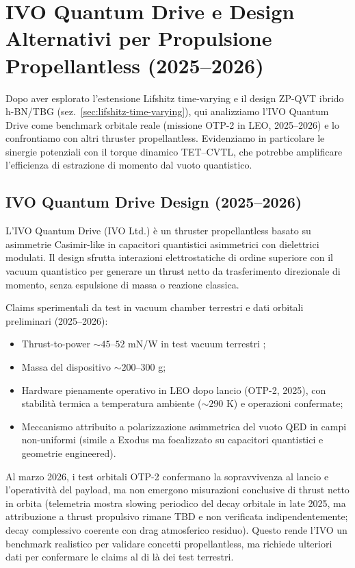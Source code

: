 \documentclass[11pt,a4paper]{article}
\let\oldcite\cite
\renewcommand{\cite}{\protect\oldcite}
\let\oldref\ref
\renewcommand{\ref}{\protect\oldref}
\theoremstyle{plain}
\theoremstyle{definition}
\begin{document}
\vspace{0.4cm}


\section{IVO Quantum Drive e Design Alternativi per Propulsione Propellantless (2025--2026)}
\label{sec:ivo-and-alternatives}

Dopo aver esplorato l'estensione Lifshitz time-varying e il design ZP-QVT ibrido h-BN/TBG (sez.~\ref{sec:lifshitz-time-varying}), qui analizziamo l'IVO Quantum Drive come benchmark orbitale reale (missione OTP-2 in LEO, 2025--2026) e lo confrontiamo con altri thruster propellantless. Evidenziamo in particolare le sinergie potenziali con il torque dinamico TET--CVTL, che potrebbe amplificare l'efficienza di estrazione di momento dal vuoto quantistico.

\subsection{IVO Quantum Drive Design (2025--2026)}

L'IVO Quantum Drive (IVO Ltd.) è un thruster propellantless basato su asimmetrie Casimir-like in capacitori quantistici asimmetrici con dielettrici modulati. Il design sfrutta interazioni elettrostatiche di ordine superiore con il vacuum quantistico per generare un thrust netto da trasferimento direzionale di momento, senza espulsione di massa o reazione classica.

Claims sperimentali da test in vacuum chamber terrestri e dati orbitali preliminari (2025--2026):
\begin{itemize}
    \item Thrust-to-power $\sim 45$--$52$ mN/W in test vacuum terrestri \cite{IVO2026};
    \item Massa del dispositivo $\sim 200$--$300$ g;
    \item Hardware pienamente operativo in LEO dopo lancio (OTP-2, 2025), con stabilità termica a temperatura ambiente ($\sim 290$ K) e operazioni confermate;
    \item Meccanismo attribuito a polarizzazione asimmetrica del vuoto QED in campi non-uniformi (simile a Exodus ma focalizzato su capacitori quantistici e geometrie engineered).
\end{itemize}

Al marzo 2026, i test orbitali OTP-2 confermano la sopravvivenza al lancio e l'operatività del payload, ma non emergono misurazioni conclusive di thrust netto in orbita (telemetria mostra slowing periodico del decay orbitale in late 2025, ma attribuzione a thrust propulsivo rimane TBD e non verificata indipendentemente; decay complessivo coerente con drag atmosferico residuo). Questo rende l'IVO un benchmark realistico per validare concetti propellantless, ma richiede ulteriori dati per confermare le claims al di là dei test terrestri.
\end{document}
